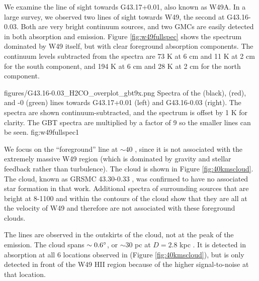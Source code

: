 We examine the line of sight towards G43.17+0.01, also known as W49A.  In a 
large survey, we observed two lines of sight towards W49, the second at
G43.16-0.03.  Both are very bright continuum sources, and two GMCs are easily
detected in both \formaldehyde absorption and \thirteenco emission.  Figure
\ref{fig:w49fullspec} shows the spectrum dominated by W49 itself, but with
clear foreground absorption components.  The continuum levels subtracted from the spectra
are 73 K at 6 cm and 11 K at 2 cm for the south component, and 194 K at 6 cm
and 28 K at 2 cm for the north component.


          {figures/G43.16-0.03_H2CO_overplot_gbt9x.png}
{Spectra of the \formaldehyde \oneone (black), \twotwo (red), and -0 (green) lines towards G43.17+0.01 (left) and G43.16-0.03 (right).
The \formaldehyde spectra are shown continuum-subtracted, and the \thirteenco
spectrum is offset by 1 K for clarity.  The GBT \twotwo spectra are multiplied
by a factor of 9 so the smaller lines can be seen.  
}{fig:w49fullspec}{1}

We focus on the ``foreground'' line at $\sim40$ \kms, since it is not
associated with the extremely massive W49 region (which is dominated by gravity
and stellar feedback rather than turbulence).  The cloud is shown in Figure
\ref{fig:40kmscloud}.  The cloud, known as GRSMC 43.30-0.33 \citep{Simon2001a},
was confirmed to have no associated star formation in that work.  Additional
\formaldehyde spectra of surrounding sources that are bright at 8-1100 \um and
within the \thirteenco contours of the cloud show that they are all at the
velocity of W49 and therefore are not associated with these foreground clouds.  

The \formaldehyde lines are observed in the outskirts of the cloud, not at
the peak of the \thirteenco emission.  The cloud spans $\sim0.6^{\circ}$, or
$\sim30$ pc at $D=2.8$ kpc \citep{Roman-Duval2009a}.  It is detected in \oneone
absorption at all 6 locations observed in \formaldehyde (Figure
\ref{fig:40kmscloud}), but \twotwo is only detected in front of the W49 HII
region because of the higher signal-to-noise at that location.  

